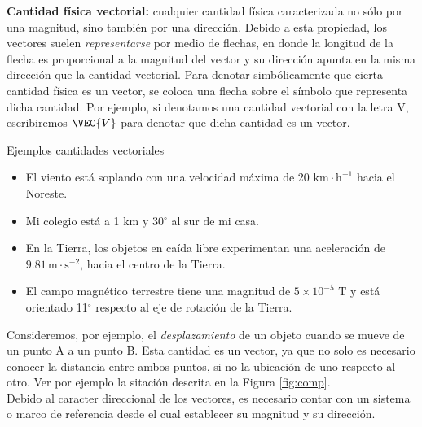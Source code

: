 \noindent\textbf{Cantidad f\'isica vectorial:} cualquier cantidad f\'isica caracterizada no s\'olo por una \underline{magnitud}, sino tambi\'en por una \underline{direcci\'on}. Debido a esta propiedad, los vectores suelen \textit{representarse} por medio de flechas, en donde la longitud de la flecha es proporcional a la magnitud del vector y su direcci\'on apunta en la misma direcci\'on que la cantidad vectorial. Para denotar simb\'olicamente que cierta cantidad f\'isica es un vector, se coloca una flecha sobre el s\'imbolo que representa dicha cantidad. Por ejemplo, si denotamos una cantidad vectorial con la letra V, escribiremos $\VEC{V}$ para denotar que dicha cantidad es un vector. \\[.5cm]

\begin{wwteorema}{Ejemplos cantidades vectoriales}

\begin{itemize}
\item El viento est\'a soplando con una velocidad m\'axima de 20 $\mbox{km}\cdot \mbox{h}^{-1}$ hacia el Noreste.
\item Mi colegio est\'a a 1 km y 30$^{\circ}$ al sur de mi casa.
\item En la Tierra, los objetos en ca\'ida libre experimentan una aceleraci\'on de $9.81 \, \mbox{m}\cdot\mbox{s}^{-2}$, hacia el centro de la Tierra.
\item El campo magn\'etico terrestre tiene una magnitud de $5\times10^{-5}$ T y est\'a orientado 11$^{\circ}$ respecto al eje de rotaci\'on de la Tierra.
\end{itemize}
\end{wwteorema}

Consideremos, por ejemplo, el \textit{desplazamiento} de un objeto cuando se mueve de un punto A a un punto B. Esta cantidad es un vector, ya que no solo es necesario conocer la distancia entre ambos puntos, si no la ubicaci\'on de uno respecto al otro. Ver por ejemplo la sitaci\'on descrita en la Figura \ref{fig:comp}. \\[.5cm]

Debido al caracter direccional de los vectores, es necesario contar con un sistema o marco de referencia desde el cual establecer su magnitud y su direcci\'on. \\[.5cm]

